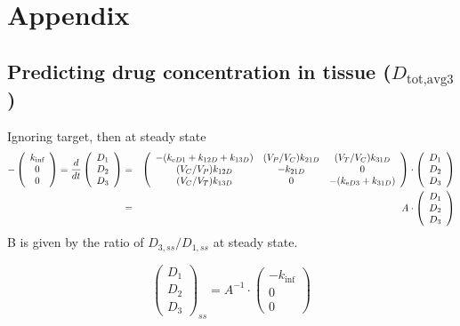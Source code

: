 \section*{Appendix}

\subsection{Predicting drug concentration in tissue ($D_{\text{tot,avg}3}$)}
Ignoring target, then at steady state
\begin{eqnarray*}
-\left(\begin{array}{c}
k_{\text{inf}}\\
0\\
0
\end{array}\right)=\frac{d}{dt}\left(\begin{array}{c}
D_{1}\\
D_{2}\\
D_{3}
\end{array}\right) & = & \left(\begin{array}{ccc}
-(k_{\text{e} D1}+k_{12D}+k_{13D}) & (V_{P}/V_{C})k_{21D} & (V_{T}/V_{C})k_{31D}\\
(V_{C}/V_{P})k_{12D} & -k_{21D} & 0\\
(V_{C}/V_{T})k_{13D} & 0 & -(k_{\text{e} D3}+k_{31D})
\end{array}\right)\cdot\left(\begin{array}{c}
D_{1}\\
D_{2}\\
D_{3}
\end{array}\right)\\
 & = & A\cdot\left(\begin{array}{c}
D_{1}\\
D_{2}\\
D_{3}
\end{array}\right)
\end{eqnarray*}
B is given by the ratio of $D_{3,ss}/D_{1,ss}$ at steady state. 

\[
\left(\begin{array}{c}
D_{1}\\
D_{2}\\
D_{3}
\end{array}\right)_{ss}=A^{-1}\cdot\left(\begin{array}{c}
-k_{\text{inf}}\\
0\\
0
\end{array}\right)
\]


